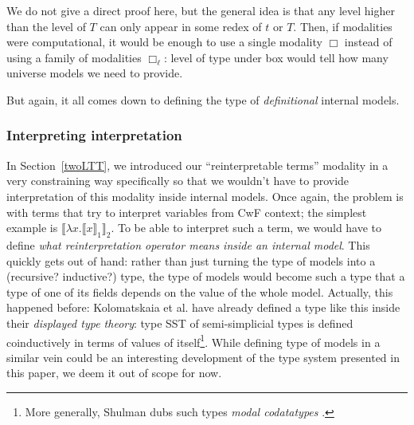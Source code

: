 We do not give a direct proof here, but the general idea
is that any level higher than the level of $T$ can only
appear in some redex of $t$ or $T$. Then, if modalities
were computational, it would be enough to use a single
modality $\Box$ instead of using a family of modalities
$\Box_\ell$: level of type under box would tell how many
universe models we need to provide.

But again, it all comes down to defining the type of
\textit{definitional} internal models.

\subsubsection{Interpreting interpretation}

In Section~\ref{twoLTT}, we introduced our
``reinterpretable terms'' modality in a very
constraining way specifically so that we wouldn't have
to provide interpretation of this modality inside
internal models. Once again, the problem is with terms
that try to interpret variables from CwF context;
the simplest example is $\llbracket \lambda x.\llbracket x
\rrbracket_1\rrbracket_2$. To be able to
interpret such a term, we would have to define \textit{
what reinterpretation operator means inside an internal
model}. This quickly gets out of hand: rather than just
turning the type of models into a (recursive? inductive?)
type, the type of models would become such a type that a
type of one of its fields depends on the value of the
whole model. Actually, this happened before:
Kolomatskaia et al. \cite{Kolomatskaia_Shulman_2025}
have already defined a type like this inside their
\textit{displayed type theory}: type SST of
semi-simplicial types is defined coinductively in terms
of values of itself\footnote{More generally, Shulman
dubs such types \textit{modal codatatypes}
\cite{shulman2026}.}. While defining type of models in
a similar vein could be an interesting development of the type
system presented in this paper, we deem it out of scope
for now.
